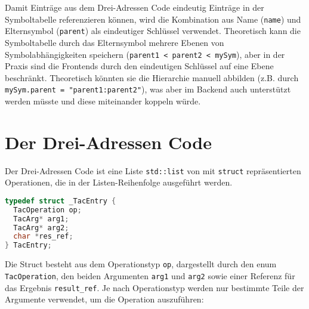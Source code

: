 Damit Einträge aus dem Drei-Adressen Code eindeutig Einträge in der Symboltabelle referenzieren können, wird die Kombination aus Name (\texttt{name}) und Elternsymbol (\texttt{parent}) als eindeutiger Schlüssel verwendet.
Theoretisch kann die Symboltabelle durch das Elternsymbol mehrere Ebenen von Symbolabhängigkeiten speichern (\texttt{parent1 < parent2 < mySym}), aber in der Praxis sind die Frontends durch den eindeutigen Schlüssel auf eine Ebene beschränkt.
Theoretisch könnten sie die Hierarchie manuell abbilden (z.B. durch \texttt{mySym.parent = "parent1:parent2"}), was aber im Backend auch unterstützt werden müsste und diese miteinander koppeln würde.\\

\section{Der Drei-Adressen Code}

Der Drei-Adressen Code ist eine Liste \texttt{std::list} von mit \texttt{struct} repräsentierten Operationen, die in der Listen-Reihenfolge ausgeführt werden.

\begin{lstlisting}[language=C++, caption={Drei-Adressen Code Eintrag}]
typedef struct _TacEntry {
  TacOperation op;
  TacArg* arg1;
  TacArg* arg2;
  char *res_ref;
} TacEntry;
\end{lstlisting}

Die Struct besteht aus dem Operationstyp \texttt{op}, dargestellt durch den enum \texttt{TacOperation}, den beiden Argumenten \texttt{arg1} und \texttt{arg2} sowie einer Referenz für das Ergebnis \texttt{result\_ref}.
Je nach Operationstyp werden nur bestimmte Teile der Argumente verwendet, um die Operation auszuführen:

